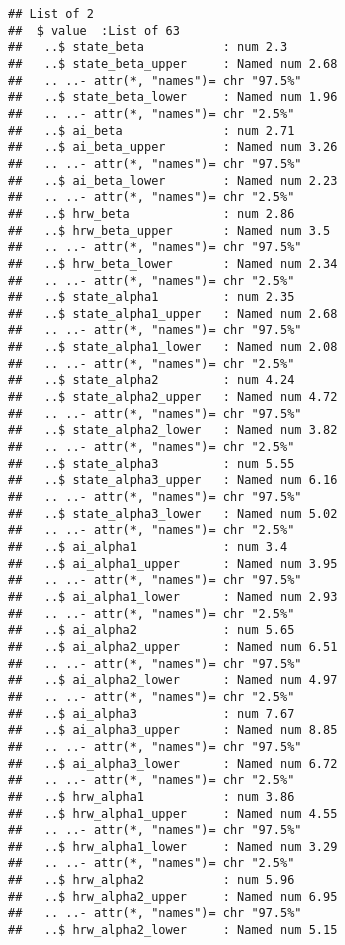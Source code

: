 \documentclass[12pt,letterpaper,leqno]{article}\usepackage[]{graphicx}\usepackage[]{color}
\makeatletter
\newenvironment{kframe}{%
 \def\at@end@of@kframe{}%
 \ifinner\ifhmode%
  \def\at@end@of@kframe{\end{minipage}}%
  \begin{minipage}{\columnwidth}%
 \fi\fi%
 \def\FrameCommand##1{\hskip\@totalleftmargin \hskip-\fboxsep
 \colorbox{shadecolor}{##1}\hskip-\fboxsep
     \hskip-\linewidth \hskip-\@totalleftmargin \hskip\columnwidth}%
 \MakeFramed {\advance\hsize-\width
   \@totalleftmargin\z@ \linewidth\hsize
   \@setminipage}}%
 {\par\unskip\endMakeFramed%
 \at@end@of@kframe}
\newenvironment{knitrout}{}{} %
\makeatother
\begin{document}
\begin{knitrout}
\color{fgcolor}\begin{kframe}
\begin{verbatim}
## List of 2
##  $ value  :List of 63
##   ..$ state_beta           : num 2.3
##   ..$ state_beta_upper     : Named num 2.68
##   .. ..- attr(*, "names")= chr "97.5%"
##   ..$ state_beta_lower     : Named num 1.96
##   .. ..- attr(*, "names")= chr "2.5%"
##   ..$ ai_beta              : num 2.71
##   ..$ ai_beta_upper        : Named num 3.26
##   .. ..- attr(*, "names")= chr "97.5%"
##   ..$ ai_beta_lower        : Named num 2.23
##   .. ..- attr(*, "names")= chr "2.5%"
##   ..$ hrw_beta             : num 2.86
##   ..$ hrw_beta_upper       : Named num 3.5
##   .. ..- attr(*, "names")= chr "97.5%"
##   ..$ hrw_beta_lower       : Named num 2.34
##   .. ..- attr(*, "names")= chr "2.5%"
##   ..$ state_alpha1         : num 2.35
##   ..$ state_alpha1_upper   : Named num 2.68
##   .. ..- attr(*, "names")= chr "97.5%"
##   ..$ state_alpha1_lower   : Named num 2.08
##   .. ..- attr(*, "names")= chr "2.5%"
##   ..$ state_alpha2         : num 4.24
##   ..$ state_alpha2_upper   : Named num 4.72
##   .. ..- attr(*, "names")= chr "97.5%"
##   ..$ state_alpha2_lower   : Named num 3.82
##   .. ..- attr(*, "names")= chr "2.5%"
##   ..$ state_alpha3         : num 5.55
##   ..$ state_alpha3_upper   : Named num 6.16
##   .. ..- attr(*, "names")= chr "97.5%"
##   ..$ state_alpha3_lower   : Named num 5.02
##   .. ..- attr(*, "names")= chr "2.5%"
##   ..$ ai_alpha1            : num 3.4
##   ..$ ai_alpha1_upper      : Named num 3.95
##   .. ..- attr(*, "names")= chr "97.5%"
##   ..$ ai_alpha1_lower      : Named num 2.93
##   .. ..- attr(*, "names")= chr "2.5%"
##   ..$ ai_alpha2            : num 5.65
##   ..$ ai_alpha2_upper      : Named num 6.51
##   .. ..- attr(*, "names")= chr "97.5%"
##   ..$ ai_alpha2_lower      : Named num 4.97
##   .. ..- attr(*, "names")= chr "2.5%"
##   ..$ ai_alpha3            : num 7.67
##   ..$ ai_alpha3_upper      : Named num 8.85
##   .. ..- attr(*, "names")= chr "97.5%"
##   ..$ ai_alpha3_lower      : Named num 6.72
##   .. ..- attr(*, "names")= chr "2.5%"
##   ..$ hrw_alpha1           : num 3.86
##   ..$ hrw_alpha1_upper     : Named num 4.55
##   .. ..- attr(*, "names")= chr "97.5%"
##   ..$ hrw_alpha1_lower     : Named num 3.29
##   .. ..- attr(*, "names")= chr "2.5%"
##   ..$ hrw_alpha2           : num 5.96
##   ..$ hrw_alpha2_upper     : Named num 6.95
##   .. ..- attr(*, "names")= chr "97.5%"
##   ..$ hrw_alpha2_lower     : Named num 5.15

\end{verbatim}
\end{kframe}
\end{knitrout}
\end{document}
